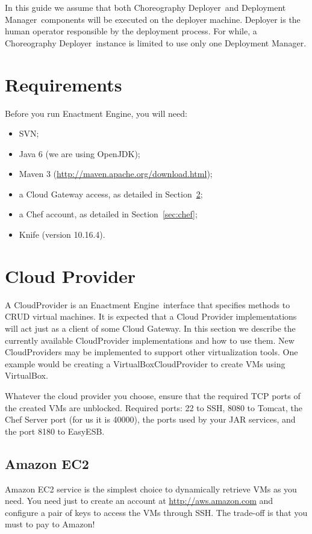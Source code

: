 \documentclass[a4paper, 10pt]{article}
\newcommand{\ee}{Enactment Engine}
\newcommand{\cd}{Choreography Deployer}
\newcommand{\dm}{Deployment Manager}
\begin{document}
In this guide we assume that both \cd\ and \dm\ components will be executed on the deployer machine. Deployer is the human operator responsible by the deployment process. For while, a \cd\ instance is limited to use only one \dm.

\section{Requirements}

Before you run \ee, you will need:

\begin{itemize}
\item SVN;
\item Java 6 (we are using OpenJDK);
\item Maven 3  (\url{http://maven.apache.org/download.html});
\item a Cloud Gateway access, as detailed in Section~\ref{sec:cloud};
\item a Chef account, as detailed in Section~\ref{sec:chef};
\item Knife (version 10.16.4).
\end{itemize}

\section{Cloud Provider}
\label{sec:cloud}

A \textsf{CloudProvider} is an \ee\ interface that specifies methods to CRUD virtual machines. It is expected that a \textsf{Cloud Provider} implementations will act just as a client of some Cloud Gateway. In this section we describe the currently available \textsf{CloudProvider} implementations and how to use them. New \textsf{CloudProvider}s may be implemented to support other virtualization tools. One example would be creating a \textsf{VirtualBoxCloudProvider} to create VMs using VirtualBox.

Whatever the cloud provider you choose, ensure that the required TCP ports of the created VMs are unblocked. Required ports: 22 to SSH, 8080 to Tomcat, the Chef Server port (for us it is 40000), the ports used by your JAR services, and the port 8180 to EasyESB.

\subsection{Amazon EC2}

Amazon EC2 service is the simplest choice to dynamically retrieve VMs as you need. You need just to create an account at \url{http://aws.amazon.com} and configure a pair of keys to access the VMs through SSH. The trade-off is that you must to pay to Amazon! 
\end{document}
